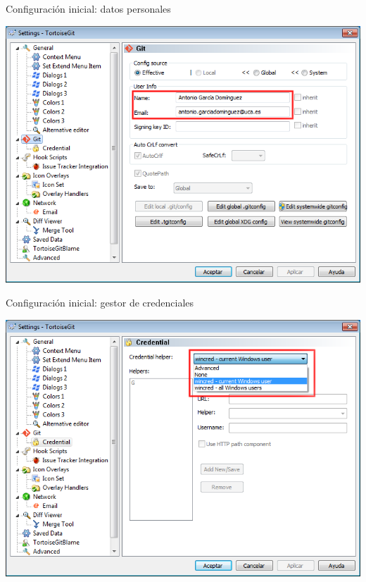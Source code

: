 \documentclass[xcolor=svgnames]{beamer}
\begin{document}
\begin{frame}{Configuración inicial: datos personales}
  \begin{center}
    \includegraphics[width=\textwidth,height=.8\textheight,keepaspectratio]{tomas/configinicial-01-pantalla}
  \end{center}
\end{frame}

\begin{frame}{Configuración inicial: gestor de credenciales}
  \begin{center}
    \includegraphics[width=\textwidth,height=.8\textheight,keepaspectratio]{tomas/configinicial-02-creds}
  \end{center}
\end{frame}
\end{document}
